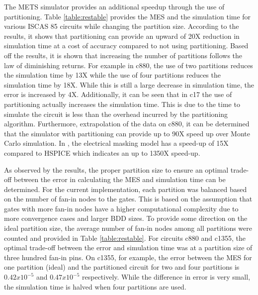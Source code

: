 \documentclass[conference]{IEEEtran}
\begin{document}
The METS simulator provides an additional speedup through the use of partitioning. Table \ref{table:restable} provides the MES and the simulation time for various ISCAS 85 circuits while changing the partition size. According to the results, it shows that partitioning can provide an upward of 20X reduction in simulation time at a cost of accuracy compared to not using partitioning. Based off the results, it is shown that increasing the number of partitions follows the law of diminishing returns. For example in c880, the use of two partitions reduces the simulation time by 13X while the use of four partitions reduces the simulation time by 18X. While this is still a large decrease in simulation time, the error is increased by 4X. Additionally, it can be seen that in c17 the use of partitioning actually increases the simulation time. This is due to the time to simulate the circuit is less than the overhead incurred by the partitioning algorithm. Furthermore, extrapolation of the data on c880, it can be determined that the simulator with partitioning can provide up to 90X speed up over Monte Carlo simulation. In \cite{Watkins2016}, the electrical masking model has a speed-up of 15X compared to HSPICE which indicates an up to 1350X speed-up.

As observed by the results, the proper partition size to ensure an optimal trade-off between the error in calculating the MES and simulation time can be determined. For the current implementation, each partition was balanced based on the number of fan-in nodes to the gates. This is based on the assumption that gates with more fan-in nodes have a higher computational complexity due to more convergence cases and larger BDD sizes. To provide some direction on the ideal partition size, the average number of fan-in nodes among all partitions were counted and provided in Table \ref{table:restable}. For circuits c880 and c1355, the optimal trade-off between the error and simulation time was at a partition size of three hundred fan-in pins. On c1355, for example, the error between the MES for one partition (ideal) and the partitioned circuit for two and four partitions is $0.42x10^{-5}$ and $0.47x10^{-5}$ respectively. While the difference in error is very small, the simulation time is halved when four partitions are used. 
\end{document}
